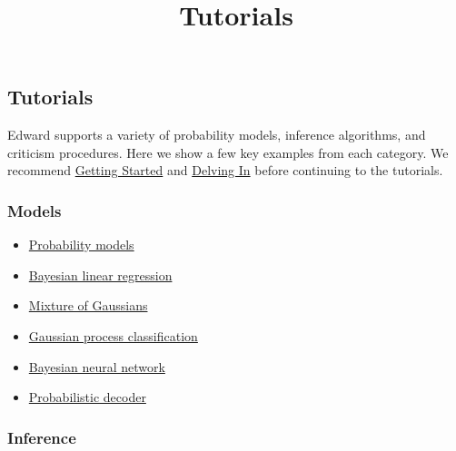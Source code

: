\title{Tutorials}

\subsection{Tutorials}

Edward supports a variety of probability models, inference
algorithms, and criticism procedures. Here we show a few key examples from each
category. We recommend \href{getting-started.html}{Getting Started} and
\href{delving-in.html}{Delving In} before continuing to the tutorials.

\subsubsection{Models}

\begin{itemize}
\item \href{tut_model.html}{Probability models}
\item \href{tut_bayesian_linear_regression.html}{Bayesian linear regression}
\item \href{tut_mixture_gaussian.html}{Mixture of Gaussians}
\item \href{tut_gp_classification.html}{Gaussian process classification}
\item \href{tut_bayesian_nn.html}{Bayesian neural network}
\item \href{tut_decoder.html}{Probabilistic decoder}
\end{itemize}

\subsubsection{Inference}

